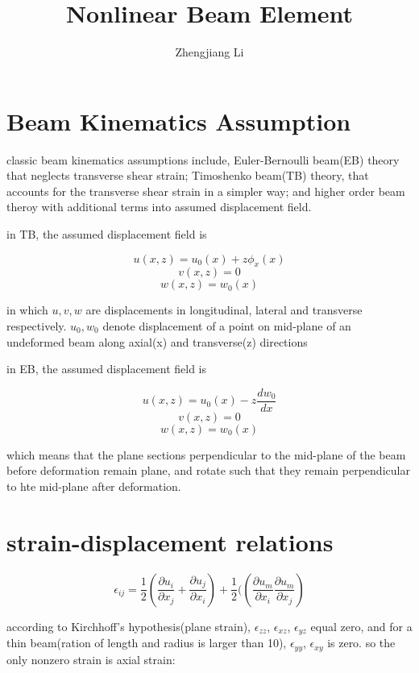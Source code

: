 \documentclass[11pt]{article}
\begin{document}
\title{Nonlinear Beam Element}

\author{Zhengjiang Li}

\date{}

\maketitle

\section{Beam Kinematics Assumption}

classic beam kinematics assumptions include, Euler-Bernoulli beam(EB) theory that neglects transverse shear strain; Timoshenko beam(TB) theory, that accounts for the transverse shear strain in a simpler way; and higher order beam theroy with additional terms into assumed displacement field.

in TB, the assumed displacement field is

$$ u(x,z) = u_0(x) + z \phi_x(x) $$
$$ v(x,z) = 0 $$
$$ w(x,z) = w_0(x) $$ 

in which $u, v, w$ are displacements in longitudinal, lateral and transverse respectively. $u_0, w_0$ denote displacement of a point on mid-plane of an undeformed beam along axial(x) and transverse(z) directions


in EB, the assumed displacement field is

$$ u(x,z) = u_0(x) - z \frac{dw_0}{dx} $$
$$ v(x,z) = 0 $$
$$ w(x,z) = w_0(x) $$

which means that the plane sections perpendicular to the mid-plane of the beam before deformation remain plane, and rotate such that they remain perpendicular to hte mid-plane after deformation.

\section{strain-displacement relations}

$$ \epsilon_{ij} = \frac{1}{2} ( \frac{\partial u_i}{\partial x_j} + \frac{\partial u_j}{\partial x_i}) + \frac{1}{2} ((\frac{\partial u_m}{\partial x_i} \frac{\partial u_m}{\partial x_j}) $$


according to Kirchhoff's hypothesis(plane strain), $\epsilon_{zz}$, $\epsilon_{xz}$, $\epsilon_{yz}$ equal zero, and for a thin beam(ration of length and radius is larger than 10), $\epsilon_{yy}$, $\epsilon_{xy}$ is zero. so the only nonzero strain is axial strain:
\end{document}
